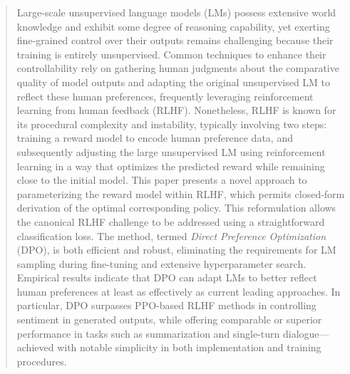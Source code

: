 \begin{abstract}
Large-scale unsupervised language models (LMs) possess extensive world knowledge and exhibit some degree of reasoning capability, yet exerting fine-grained control over their outputs remains challenging because their training is entirely unsupervised. Common techniques to enhance their controllability rely on gathering human judgments about the comparative quality of model outputs and adapting the original unsupervised LM to reflect these human preferences, frequently leveraging reinforcement learning from human feedback (RLHF). Nonetheless, RLHF is known for its procedural complexity and instability, typically involving two steps: training a reward model to encode human preference data, and subsequently adjusting the large unsupervised LM using reinforcement learning in a way that optimizes the predicted reward while remaining close to the initial model. This paper presents a novel approach to parameterizing the reward model within RLHF, which permits closed-form derivation of the optimal corresponding policy. This reformulation allows the canonical RLHF challenge to be addressed using a straightforward classification loss. The method, termed \textit{Direct Preference Optimization} (DPO), is both efficient and robust, eliminating the requirements for LM sampling during fine-tuning and extensive hyperparameter search. Empirical results indicate that DPO can adapt LMs to better reflect human preferences at least as effectively as current leading approaches. In particular, DPO surpasses PPO-based RLHF methods in controlling sentiment in generated outputs, while offering comparable or superior performance in tasks such as summarization and single-turn dialogue—achieved with notable simplicity in both implementation and training procedures.
\end{abstract}


